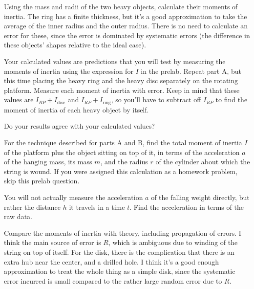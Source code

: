 
Using the mass and radii of the two heavy objects, calculate their
moments of inertia. The ring has a finite thickness, but it's a good
approximation to take the average of the inner radius and the outer
radius. There is no need to calculate an error for these, since the
error is dominated by systematic errors (the difference in these
objects' shapes relative to the ideal case). 

Your calculated values are predictions that you will test by measuring
the moments of inertia using the expression for $I$ in the
prelab. Repeat part A, but this time placing the heavy ring and
the heavy disc separately on the rotating platform. Measure each
moment of inertia with error. Keep in mind that these values are
$I_{RP} + I_\text{disc}$ and $I_{RP} + I_\text{ring}$, so you'll have
to subtract off $I_{RP}$ to find the moment of inertia of each heavy
object by itself. 

Do your results agree with your calculated values?

\prelab

\prelabquestion For the technique described for parts A and B, 
find the total moment of inertia
$I$ of the platform plus the object sitting on top of it, in terms
of the acceleration $a$ of the hanging mass, its mass $m$, and the radius
$r$ of the cylinder about which the string is wound. If you were assigned
this calculation as a homework problem, skip this prelab question.

\prelabquestion You will not actually measure the acceleration $a$
of the falling weight directly, but rather the distance $h$ it travels
in a time $t$. Find the acceleration in terms of the raw data.

\analysis

Compare the moments of inertia with theory, including propagation of
errors. I think the main source of error is $R$, which is ambiguous due
to winding of the string on top of itself. For the disk, there is the
complication that there is an extra hub near the center, and a drilled
hole. I think it's a good enough approximation to treat the whole thing
as a simple disk, since the systematic error incurred is small compared
to the rather large random error due to $R$.
